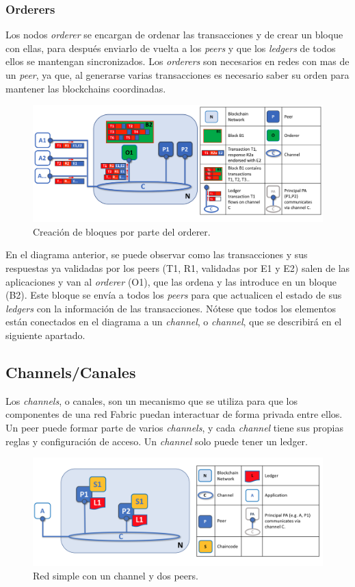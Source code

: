 \subsubsection{Orderers}
Los nodos \textit{orderer} se encargan de ordenar las transacciones y de crear un bloque con ellas, para después enviarlo de vuelta a los \textit{peers} y que los \textit{ledgers} de todos ellos se mantengan sincronizados. Los \textit{orderers} son necesarios en redes con mas de un \textit{peer}, ya que, al generarse varias transacciones es necesario saber su orden para mantener las blockchains coordinadas.
\begin{figure}[H]
\centerline{\includegraphics[scale=0.4]{recursos/orderers.png}}
\caption{Creación de bloques por parte del orderer.}
\label{orderers}
\end{figure}
En el diagrama anterior, se puede observar como las transacciones y sus respuestas ya validadas por los peers (T1, R1, validadas por E1 y E2) salen de las aplicaciones y van al \textit{orderer} (O1), que las ordena y las introduce en un bloque (B2). Este bloque se envía a todos los \textit{peers} para que actualicen el estado de sus \textit{ledgers} con la información de las transacciones.
Nótese que todos los elementos están conectados en el diagrama a un \textit{channel}, o \textit{channel}, que se describirá en el siguiente apartado.
\clearpage
\subsection{Channels/Canales}
Los \textit{channels}, o canales, son un mecanismo que se utiliza para que los componentes de una red Fabric puedan interactuar de forma privada entre ellos. Un peer puede formar parte de varios \textit{channels}, y cada \textit{channel} tiene sus propias reglas y configuración de acceso. Un \textit{channel} solo puede tener un ledger.
\begin{figure}[H]
\centerline{\includegraphics[scale=0.3]{recursos/canales.png}}
\caption{Red simple con un channel y dos peers.}
\label{canales}
\end{figure}
